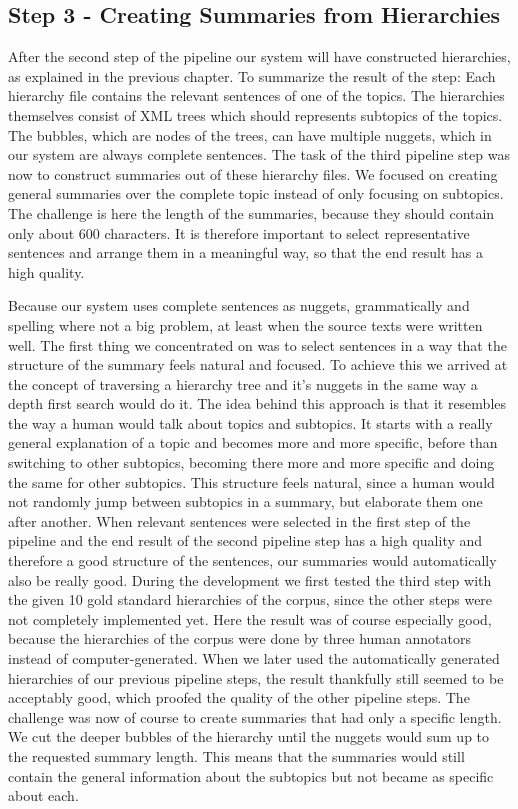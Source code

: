
\subsection{Step 3 - Creating Summaries from Hierarchies}
After the second step of the pipeline our system will have constructed hierarchies,
as explained in the previous chapter. To summarize the result of the step: Each
hierarchy file contains the relevant sentences of one of the topics. The hierarchies
themselves consist of XML trees which should represents subtopics of the topics.
The bubbles, which are nodes of the trees, can have multiple nuggets, which in
our system are always complete sentences. The task of the third pipeline step
was now to construct summaries out of these hierarchy files. We focused on
creating general summaries over the complete topic instead of only focusing on
subtopics. The challenge is here the length of the summaries, because they should
contain only about 600 characters. It is therefore important to select
representative sentences and arrange them in a meaningful way, so that the end
result has a high quality. 

Because our system uses complete sentences as nuggets, grammatically and spelling
where not a big problem, at least when the source texts were written well. The
first thing we concentrated on was to select sentences in a way that the structure
of the summary feels natural and focused. To achieve this we arrived at the
concept of traversing a hierarchy tree and it's nuggets in the same way a depth
first search would do it. The idea behind this approach is that it resembles the
way a human would talk about topics and subtopics. It starts with a really general
explanation of a topic and becomes more and more specific, before than switching
to other subtopics, becoming there more and more specific and doing the same for
other subtopics. This structure feels natural, since a human would not randomly
jump between subtopics in a summary, but elaborate them one after another.
When relevant sentences were selected in the first step of the
pipeline and the end result of the second pipeline step has a high quality
and therefore a good structure of the sentences, our summaries would automatically
also be really good. During the development we first tested the third step with
the given 10 gold standard hierarchies of the corpus, since the other steps were
not completely implemented yet. Here the result was of course especially good,
because the hierarchies of the corpus were done by three human annotators
instead of computer-generated. When we later used the automatically generated
hierarchies of our previous pipeline steps, the result thankfully still seemed
to be acceptably good, which proofed the quality of the other pipeline steps.
The challenge was now of course to create summaries that
had only a specific length. We cut the deeper bubbles of the hierarchy until the
nuggets would sum up to the requested summary length. This means that the summaries
would still contain the general information about the subtopics but not became
as specific about each.

